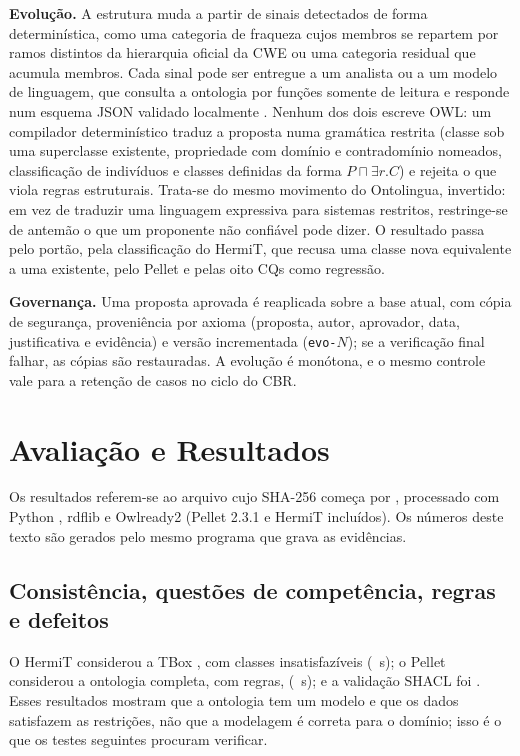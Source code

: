 \documentclass[12pt]{article}
\begin{document}
\textbf{Evolução.} A estrutura muda a partir de sinais detectados de forma determinística, como uma categoria de fraqueza cujos membros se repartem por ramos distintos da hierarquia oficial da CWE ou uma categoria residual que acumula membros. Cada sinal pode ser entregue a um analista ou a um modelo de linguagem, que consulta a ontologia por funções somente de leitura e responde num esquema JSON validado localmente \cite{geminiapi}. Nenhum dos dois escreve OWL: um compilador determinístico traduz a proposta numa gramática restrita (classe sob uma superclasse existente, propriedade com domínio e contradomínio nomeados, classificação de indivíduos e classes definidas da forma $P \sqcap \exists r.C$) e rejeita o que viola regras estruturais. Trata-se do mesmo movimento do Ontolingua, invertido: em vez de traduzir uma linguagem expressiva para sistemas restritos, restringe-se de antemão o que um proponente não confiável pode dizer. O resultado passa pelo portão, pela classificação do HermiT, que recusa uma classe nova equivalente a uma existente, pelo Pellet e pelas oito CQs como regressão.

\textbf{Governança.} Uma proposta aprovada é reaplicada sobre a base atual, com cópia de segurança, proveniência por axioma (proposta, autor, aprovador, data, justificativa e evidência) e versão incrementada (\texttt{evo-$N$}); se a verificação final falhar, as cópias são restauradas. A evolução é monótona, e o mesmo controle vale para a retenção de casos no ciclo do CBR.

\section{Avaliação e Resultados}
\label{sec:res}

Os resultados referem-se ao arquivo cujo SHA-256 começa por \texttt{\vSevenHash}, processado com Python \envPython{}, rdflib \envRdflib{} e Owlready2 \envOwlready{} (Pellet 2.3.1 e HermiT incluídos). Os números deste texto são gerados pelo mesmo programa que grava as evidências.

\subsection{Consistência, questões de competência, regras e defeitos}

O HermiT considerou a TBox \hermitOK{}, com \hermitUnsat{} classes insatisfazíveis (\hermitSec{}~s); o Pellet considerou a ontologia completa, com regras, \pelletOK{} (\pelletSec{}~s); e a validação SHACL foi \shaclOK{}. Esses resultados mostram que a ontologia tem um modelo e que os dados satisfazem as restrições, não que a modelagem é correta para o domínio; isso é o que os testes seguintes procuram verificar.
\end{document}
